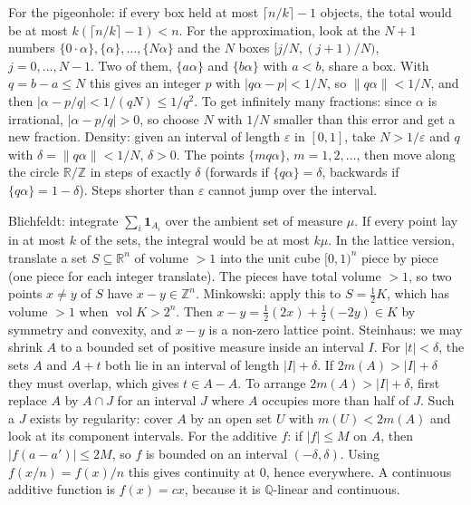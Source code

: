 \documentclass[11pt,a4paper]{article}
\begin{document}

 For the pigeonhole: if every box held at most $\lceil n/k\rceil-1$ objects, the total would be at most $k(\lceil n/k\rceil-1)<n$. For the approximation, look at the $N+1$ numbers $\{0\cdot\alpha\},\{\alpha\},\dots,\{N\alpha\}$ and the $N$ boxes $[j/N,(j+1)/N)$, $j=0,\dots,N-1$.
 Two of them, $\{a\alpha\}$ and $\{b\alpha\}$ with $a<b$, share a box. With $q=b-a\le N$ this gives an integer $p$ with $|q\alpha-p|<1/N$, so $\|q\alpha\|<1/N$, and then $|\alpha-p/q|<1/(qN)\le 1/q^2$. To get infinitely many fractions: since $\alpha$ is irrational, $|\alpha-p/q|>0$, so choose $N$ with $1/N$ smaller than this error and get a new fraction.
 Density: given an interval of length $\varepsilon$ in $[0,1]$, take $N>1/\varepsilon$ and $q$ with $\delta=\|q\alpha\|<1/N$, $\delta>0$. The points $\{mq\alpha\}$, $m=1,2,\dots$, then move along the circle $\mathbb R/\mathbb Z$ in steps of exactly $\delta$ (forwards if $\{q\alpha\}=\delta$, backwards if $\{q\alpha\}=1-\delta$). Steps shorter than $\varepsilon$ cannot jump over the interval.

 Blichfeldt: integrate $\sum_i \mathbf 1_{A_i}$ over the ambient set of measure $\mu$. If every point lay in at most $k$ of the sets, the integral would be at most $k\mu$. In the lattice version, translate a set $S\subseteq\mathbb R^n$ of volume $>1$ into the unit cube $[0,1)^n$ piece by piece (one piece for each integer translate). The pieces have total volume $>1$, so two points $x\neq y$ of $S$ have $x-y\in\mathbb Z^n$.
 Minkowski: apply this to $S=\tfrac12 K$, which has volume $>1$ when $\operatorname{vol}K>2^n$. Then $x-y=\tfrac12(2x)+\tfrac12(-2y)\in K$ by symmetry and convexity, and $x-y$ is a non-zero lattice point.
 Steinhaus: we may shrink $A$ to a bounded set of positive measure inside an interval $I$. For $|t|<\delta$, the sets $A$ and $A+t$ both lie in an interval of length $|I|+\delta$. If $2m(A)>|I|+\delta$ they must overlap, which gives $t\in A-A$. To arrange $2m(A)>|I|+\delta$, first replace $A$ by $A\cap J$ for an interval $J$ where $A$ occupies more than half of $J$. Such a $J$ exists by regularity: cover $A$ by an open set $U$ with $m(U)<2m(A)$ and look at its component intervals.
 For the additive $f$: if $|f|\le M$ on $A$, then $|f(a-a')|\le 2M$, so $f$ is bounded on an interval $(-\delta,\delta)$. Using $f(x/n)=f(x)/n$ this gives continuity at $0$, hence everywhere. A continuous additive function is $f(x)=cx$, because it is $\mathbb Q$-linear and continuous.
\end{document}

